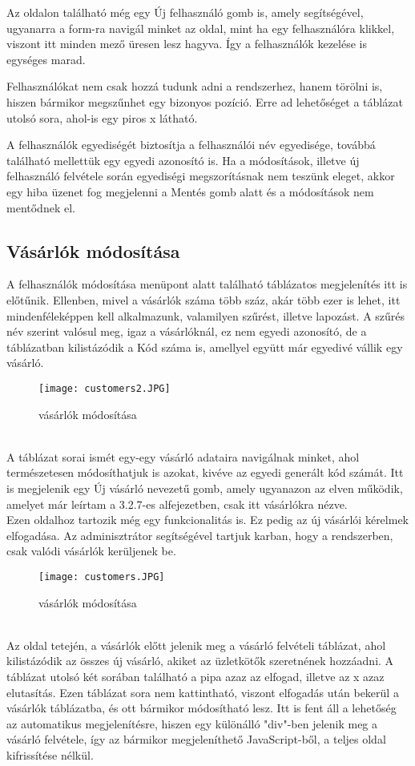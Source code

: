 Az oldalon található még egy Új felhasználó gomb is, amely segítségével, ugyanarra a form-ra navigál minket az oldal, mint ha egy felhasználóra klikkel, viszont itt minden mező üresen lesz hagyva. Így a felhasználók kezelése is egységes marad.

Felhasználókat nem csak hozzá tudunk adni a rendszerhez, hanem törölni is, hiszen bármikor megszűnhet egy bizonyos pozíció. Erre ad lehetőséget a táblázat utolsó sora, ahol-is egy piros x látható.

A felhasználók egyediségét biztosítja a felhasználói név egyedisége, továbbá található mellettük egy egyedi azonosító is. Ha a módosítások, illetve új felhasználó felvétele során egyediségi megszorításnak nem teszünk eleget, akkor egy hiba üzenet fog megjelenni a Mentés gomb alatt és a módosítások nem mentődnek el.
\subsection{Vásárlók módosítása}
A felhasználók módosítása menüpont alatt található táblázatos megjelenítés itt is előtűnik. Ellenben, mivel a vásárlók száma több száz, akár több ezer is lehet, itt mindenféleképpen kell alkalmazunk, valamilyen szűrést, illetve lapozást. A szűrés név szerint valósul meg, igaz a vásárlóknál, ez nem egyedi azonosító, de a táblázatban kilistázódik a Kód száma is, amellyel együtt már egyedivé vállik egy vásárló. 
\begin{figure}[h]
    \centering
    \texttt{[image: customers2.JPG]}
    \caption{vásárlók módosítása}
\end{figure}\\
A táblázat sorai ismét egy-egy vásárló adataira navigálnak minket, ahol természetesen módosíthatjuk is azokat, kivéve az egyedi generált kód számát. Itt is megjelenik egy Új vásárló nevezetű gomb, amely ugyanazon az elven működik, amelyet már leírtam a 3.2.7-es alfejezetben, csak itt vásárlókra nézve.\\
Ezen oldalhoz tartozik még egy funkcionalitás is. Ez pedig az új vásárlói kérelmek elfogadása. Az adminisztrátor segítségével tartjuk karban, hogy a rendszerben, csak valódi vásárlók kerüljenek be.
\begin{figure}[h]
    \centering
    \texttt{[image: customers.JPG]}
    \caption{vásárlók módosítása}
\end{figure}\\
Az oldal tetején, a vásárlók előtt jelenik meg a vásárló felvételi táblázat, ahol kilistázódik az összes új vásárló, akiket az üzletkötők szeretnének hozzáadni. A táblázat utolsó két sorában található a pipa azaz az elfogad, illetve az x azaz elutasítás. Ezen táblázat sora nem kattintható, viszont elfogadás után bekerül a vásárlók táblázatba, és ott bármikor módosítható lesz. Itt is fent áll a lehetőség az automatikus megjelenítésre, hiszen egy különálló "div"-ben jelenik meg a vásárló felvétele, így az bármikor megjeleníthető JavaScript-ből, a teljes oldal kifrissítése nélkül.

